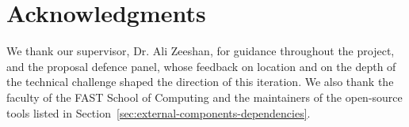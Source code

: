 \chapter*{Acknowledgments}
We thank our supervisor, Dr. Ali Zeeshan, for guidance throughout the project, and the proposal defence panel, whose feedback on location and on the depth of the technical challenge shaped the direction of this iteration. We also thank the faculty of the FAST School of Computing and the maintainers of the open-source tools listed in Section~\ref{sec:external-components-dependencies}.
